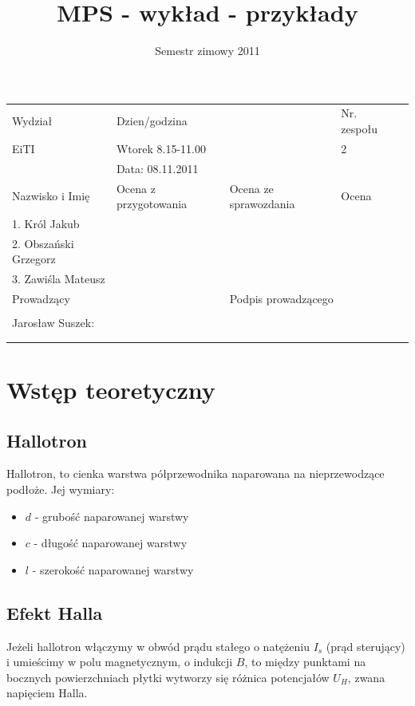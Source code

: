 \documentclass[10pt,a4paper]{article}
\begin{document}
\title{MPS - wykład - przykłady}
\date{Semestr zimowy 2011}
\begin{tabular}{|l|l|l|l|l|}
\hline
Wydział & \multicolumn{2}{l|}{Dzien/godzina}& Nr. zespołu\\
EiTI & \multicolumn{2}{l|}{Wtorek 8.15-11.00}& 2\\
\cline{2-3}
& \multicolumn{2}{l|}{Data: 08.11.2011}& \\
\hline
Nazwisko i Imię & Ocena z przygotowania & Ocena ze sprawozdania & Ocena\\
\hline
1. Król Jakub & & & \\
2. Obszański Grzegorz & & & \\
3. Zawiśla Mateusz & & & \\
\hline
\multicolumn{2}{|l|}{Prowadzący} & \multicolumn{2}{l|}{Podpis prowadzącego}\\
\multicolumn{2}{|l|}{} & \multicolumn{2}{l|}{}\\
\multicolumn{2}{|l|}{Jarosław Suszek:} & \multicolumn{2}{l|}{}\\
\multicolumn{2}{|l|}{} & \multicolumn{2}{l|}{}\\
\multicolumn{2}{|l|}{} & \multicolumn{2}{l|}{}\\\hline
 \end{tabular}
 \vspace{3cm}
\section{Wstęp teoretyczny}
\subsection{Hallotron}
Hallotron, to cienka warstwa półprzewodnika naparowana na nieprzewodzące podłoże. Jej wymiary:
\begin{itemize}
\item $d$ - grubość naparowanej warstwy
\item $c$ - długość naparowanej warstwy
\item $l$ - szerokość naparowanej warstwy
\end{itemize}
\subsection{Efekt Halla}
Jeżeli hallotron włączymy w obwód prądu stałego o natężeniu $I_s$ (prąd sterujący) i umieścimy w polu magnetycznym, o indukcji $B$, to między punktami na bocznych powierzchniach płytki wytworzy się różnica potencjałów $U_H$, zwana napięciem Halla. 
\end{document}
